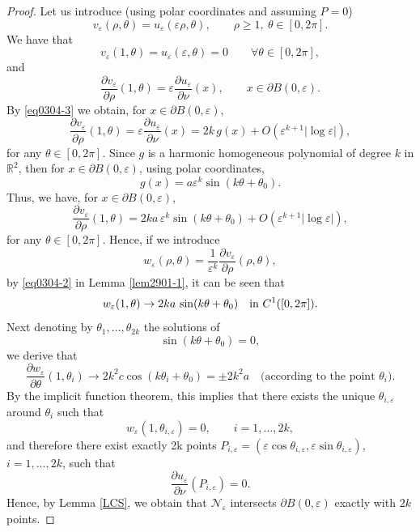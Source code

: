 \documentclass[11pt,reqno]{article}
\numberwithin{equation}{section}
\newcommand\R{\mathbb R}
\newcommand\e\varepsilon
\begin{document}
    \begin{proof}
    Let us introduce (using polar coordinates and assuming $P=0$)
\[
v_\varepsilon(\rho,\theta)=u_\varepsilon(\varepsilon\rho,\theta),
\qquad \rho\ge1,\ \theta\in[0,2\pi].
\]
We have that
\[
v_\varepsilon(1,\theta)=u_\varepsilon(\varepsilon,\theta)=0
\qquad \forall \theta\in[0,2\pi],
\]
and
\[
\frac{\partial v_\varepsilon}{\partial \rho}(1,\theta)
=
\varepsilon \frac{\partial u_\varepsilon}{\partial \nu}(x),
\qquad x\in \partial B(0,\varepsilon).
\]
By \eqref{eq0304-3} we obtain, for $x\in \partial B(0,\varepsilon)$,
\[
\frac{\partial v_\varepsilon}{\partial \rho}(1,\theta)
=
\varepsilon \frac{\partial u_\varepsilon}{\partial \nu}(x)
=
2k\, g(x)+O(\varepsilon^{k+1} |\log \varepsilon|)
,
\]
for any $\theta\in[0,2\pi]$.
Since $g$ is a harmonic homogeneous polynomial of degree $k$ in $\R^2$, then for $x\in\partial B(0,\e)$, using polar coordinates, 
$$
g(x)=a\e^k\sin(k\theta+\theta_0).
$$
Thus, we have, for $x\in\partial B(0,\e)$,
$$
\frac{\partial v_\varepsilon}{\partial \rho}(1,\theta)
=2k a\, \varepsilon^{k}\sin(k\theta+\theta_0)
+O(\varepsilon^{k+1} |\log \varepsilon|),
$$
for any $\theta\in[0,2\pi]$.
Hence, if we introduce
\[
w_\varepsilon(\rho,\theta)=\frac{1}{\varepsilon^{k}} \frac{\partial v_\varepsilon}{\partial \rho}(\rho,\theta),
\]
 by \eqref{eq0304-2} in Lemma \ref{lem2901-1}, it can be seen that 
\[
w_\varepsilon(1,\theta)\to 2ka\,\sin(k\theta+\theta_0)
\quad  \hbox{in}\ C^1([0,2\pi]).
\]
Next denoting by $\theta_1,\dots,\theta_{2k}$ the solutions of
\[
\sin(k\theta+\theta_0)=0,
\]
we derive that 
$$ \frac{\partial w_\e}{\partial \theta}(1,\theta_i)\to 2k^2c\cos(k\theta_i+\theta_0)=\pm 2k^2a\quad \text{(according to the point $\theta_i$)}.
$$
By the implicit function theorem, this implies that there exists the unique $\theta_{i,\varepsilon}$ around $\theta_i$
such that
\[
w_\varepsilon(1,\theta_{i,\varepsilon})=0,
\qquad i=1,\dots,2k,
\]
and therefore there exist exactly 2k points $P_{i,\varepsilon}=(\e \cos \theta_{i,\varepsilon}, \e\sin \theta_{i,\varepsilon})$, $i=1,\ldots,2k$, such that 
\[
\frac{\partial u_\varepsilon}{\partial \nu}(P_{i,\varepsilon})=0.
\]
Hence, by  Lemma \ref{LCS}, we obtain that $\mathcal{N}_\varepsilon$ intersects
$\partial B(0,\varepsilon)$  exactly with $2k$ points.
    \end{proof}
 	
	
	
	
	
	
	
\end{document}
